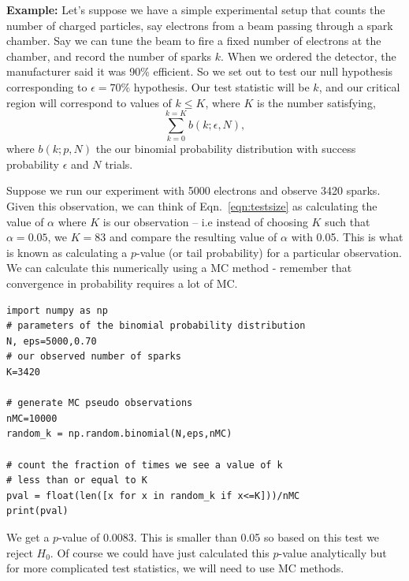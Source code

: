 \begin{tcolorbox}[colback=backblue]
\textbf{Example:} Let's suppose we have a simple experimental setup that counts the number of charged particles, say electrons from a beam passing through a spark chamber. Say we can tune the beam to fire a fixed number of electrons at the chamber, and record the number of sparks $k$. When we ordered the detector, the manufacturer said it was 90\% efficient. So we set out to test our null hypothesis corresponding to $\epsilon=70\%$ hypothesis. Our test statistic will be $k$, and our critical region will correspond to values of $k\leq K$, where $K$ is the number satisfying, 
\begin{equation}
    \sum_{k=0}^{k=K} b(k;\epsilon,N),
\end{equation}
where $b(k;p,N)$ the our binomial probability distribution with success probability $\epsilon$ and $N$ trials. 

Suppose we run our experiment with 5000 electrons and observe 3420 sparks. Given this observation, we can think of Eqn.~\ref{eqn:testsize} as calculating the value of $\alpha$ where $K$ is our observation -- i.e instead of choosing $K$ such that $\alpha=0.05$, we  $K=83$ and compare the resulting value of $\alpha$ with 0.05. This is what is known as calculating a $p$-value (or tail probability) for a particular observation. We can calculate this numerically using a MC method - remember that convergence in probability requires a lot of MC. 

\begin{lstlisting}[style = Python]
import numpy as np
# parameters of the binomial probability distribution
N, eps=5000,0.70
# our observed number of sparks
K=3420

# generate MC pseudo observations
nMC=10000
random_k = np.random.binomial(N,eps,nMC)

# count the fraction of times we see a value of k
# less than or equal to K
pval = float(len([x for x in random_k if x<=K]))/nMC
print(pval)
\end{lstlisting}
We get a $p$-value of 0.0083.  This is smaller than 0.05 so based on this test we reject $H_0$. Of course we could have just calculated this $p$-value analytically but for more complicated test statistics, we will need to use MC methods.  
\end{tcolorbox}

